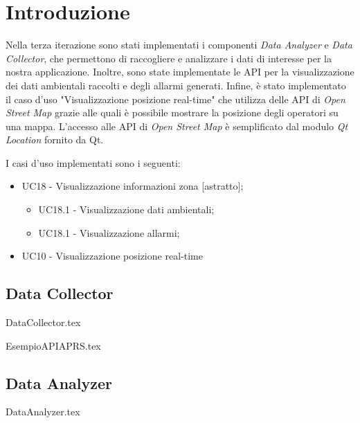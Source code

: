 \section{Introduzione}
Nella terza iterazione sono stati implementati i componenti \textit{Data Analyzer} e \textit{Data Collector}, che permettono di raccogliere e analizzare i dati di interesse per la nostra applicazione. Inoltre, sono state implementate le API per la visualizzazione dei dati ambientali raccolti e degli allarmi generati. Infine, è stato implementato il caso d'uso "Visualizzazione posizione real-time" che utilizza delle API di \textit{Open Street Map} grazie alle quali è possibile mostrare la posizione degli operatori su una mappa. L'accesso alle API di \textit{Open Street Map} è semplificato dal modulo \textit{Qt Location} fornito da Qt. 

I casi d'uso implementati sono i seguenti:
\begin{itemize}
	\item UC18 - Visualizzazione informazioni zona [astratto];
	\begin{itemize}
		\item UC18.1 - Visualizzazione dati ambientali;
		\item UC18.1 - Visualizzazione allarmi;
	\end{itemize}
	\item UC10 - Visualizzazione posizione real-time
\end{itemize}


\subsection{Data Collector}
{DataCollector.tex}

\clearpage

{EsempioAPIAPRS.tex}

\clearpage

\subsection{Data Analyzer}
{DataAnalyzer.tex}

\clearpage

